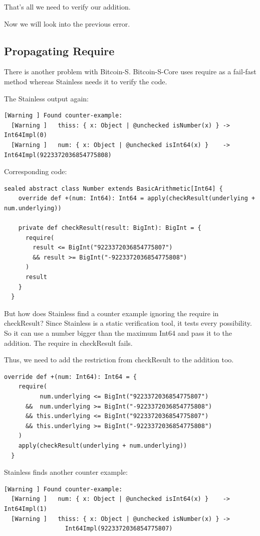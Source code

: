 \documentclass[runningheads]{llncs}
\begin{document}
That's all we need to verify our addition.

Now we will look into the previous error.


\subsection{Propagating Require}

There is another problem with Bitcoin-S.
Bitcoin-S-Core uses require as a fail-fast method whereas Stainless needs it to verify the code.

The Stainless output again:
\begin{lstlisting}[style=stainless]
  [Warning ] Found counter-example:
  [Warning ]   thiss: { x: Object | @unchecked isNumber(x) } -> Int64Impl(0)
  [Warning ]   num: { x: Object | @unchecked isInt64(x) }    -> Int64Impl(9223372036854775808)
\end{lstlisting}

Corresponding code:

\begin{lstlisting}[style=scala]
  sealed abstract class Number extends BasicArithmetic[Int64] {
    override def +(num: Int64): Int64 = apply(checkResult(underlying + num.underlying))

    private def checkResult(result: BigInt): BigInt = {
      require(
        result <= BigInt("9223372036854775807")
        && result >= BigInt("-9223372036854775808")
      )
      result
    }
  }
\end{lstlisting}

But how does Stainless find a counter example ignoring the require in checkResult?
Since Stainless is a static verification tool, it tests every possibility.
So it can use a number bigger than the maximum Int64 and pass it to the addition.
The require in checkResult fails.

Thus, we need to add the restriction from checkResult to the addition too.
\begin{lstlisting}[style=scala]
  override def +(num: Int64): Int64 = {
    require(
          num.underlying <= BigInt("9223372036854775807")
      &&  num.underlying >= BigInt("-9223372036854775808")
      && this.underlying <= BigInt("9223372036854775807")
      && this.underlying >= BigInt("-9223372036854775808")
    )
    apply(checkResult(underlying + num.underlying))
  }
\end{lstlisting}

Stainless finds another counter example:
\begin{lstlisting}[style=stainless]
  [Warning ] Found counter-example:
  [Warning ]   num: { x: Object | @unchecked isInt64(x) }    -> Int64Impl(1)
  [Warning ]   thiss: { x: Object | @unchecked isNumber(x) } ->
                 Int64Impl(9223372036854775807)
\end{lstlisting}
\end{document}
